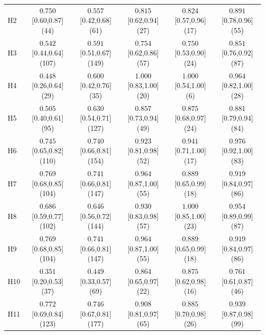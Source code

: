 \begin{table}[!htbp]
\begin{tabular*}{\linewidth}{@{\extracolsep{\fill}}lccccc@{}}
H2 & $0.750$ [0.60,0.87] (44) & $0.557$ [0.42,0.68] (61) & $0.815$ [0.62,0.94] (27) & $0.824$ [0.57,0.96] (17) & $0.891$ [0.78,0.96] (55) \\
H3 & $0.542$ [0.44,0.64] (107) & $0.591$ [0.51,0.67] (149) & $0.754$ [0.62,0.86] (57) & $0.750$ [0.53,0.90] (24) & $0.851$ [0.76,0.92] (87) \\
H4 & $0.448$ [0.26,0.64] (29) & $0.600$ [0.42,0.76] (35) & $\mathbf{1.000}$ [0.83,1.00] (20) & $\mathbf{1.000}$ [0.54,1.00] (6) & $0.964$ [0.82,1.00] (28) \\
H5 & $0.505$ [0.40,0.61] (95) & $0.630$ [0.54,0.71] (127) & $0.857$ [0.73,0.94] (49) & $0.875$ [0.68,0.97] (24) & $0.881$ [0.79,0.94] (84) \\
H6 & $0.745$ [0.65,0.82] (110) & $0.740$ [0.66,0.81] (154) & $0.923$ [0.81,0.98] (52) & $0.941$ [0.71,1.00] (17) & $\mathbf{0.976}$ [0.92,1.00] (83) \\
H7 & $0.769$ [0.68,0.85] (104) & $0.741$ [0.66,0.81] (147) & $0.964$ [0.87,1.00] (55) & $0.889$ [0.65,0.99] (18) & $0.919$ [0.84,0.97] (86) \\
H8 & $0.686$ [0.59,0.77] (102) & $0.646$ [0.56,0.72] (144) & $0.930$ [0.83,0.98] (57) & $\mathbf{1.000}$ [0.85,1.00] (23) & $0.954$ [0.89,0.99] (87) \\
H9 & $0.769$ [0.68,0.85] (104) & $0.741$ [0.66,0.81] (147) & $0.964$ [0.87,1.00] (55) & $0.889$ [0.65,0.99] (18) & $0.919$ [0.84,0.97] (86) \\
H10 & $0.351$ [0.20,0.53] (37) & $0.449$ [0.33,0.57] (69) & $0.864$ [0.65,0.97] (22) & $0.875$ [0.62,0.98] (16) & $0.761$ [0.61,0.87] (46) \\
H11 & $0.772$ [0.69,0.84] (123) & $0.746$ [0.67,0.81] (177) & $0.908$ [0.81,0.97] (65) & $0.885$ [0.70,0.98] (26) & $0.939$ [0.87,0.98] (99) \\
\bottomrule
\end{tabular*}
\end{table}
